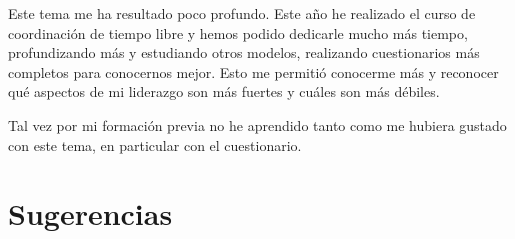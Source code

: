 \documentclass[palatino,nochap]{apuntesURJC}
\begin{document}
Este tema me ha resultado poco profundo.
%
Este año he realizado el curso de coordinación de tiempo libre y hemos podido dedicarle mucho más tiempo, profundizando más y estudiando otros modelos, realizando cuestionarios más completos para conocernos mejor.
%
Esto me permitió conocerme más y reconocer qué aspectos de mi liderazgo son más fuertes y cuáles son más débiles.

Tal vez por mi formación previa no he aprendido tanto como me hubiera gustado con este tema, en particular con el cuestionario.



\section{Sugerencias}



%
%

\printindex
\end{document}
